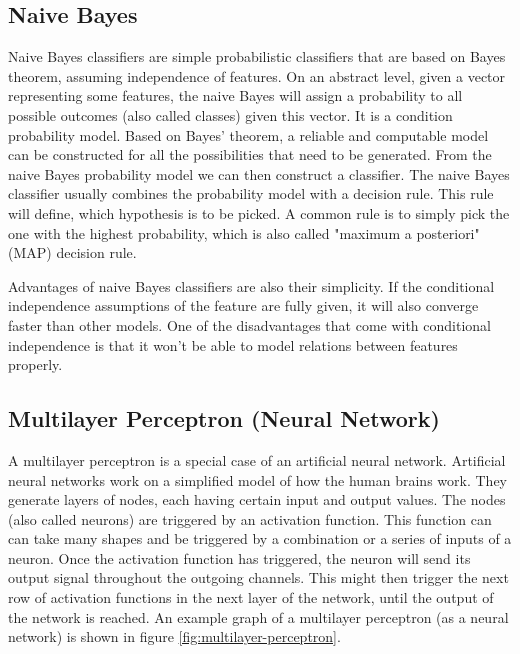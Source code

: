 \subsection{Naive Bayes}
Naive Bayes classifiers are simple probabilistic classifiers that are based on Bayes theorem, assuming independence of features. On an abstract level, given a vector representing some features, the naive Bayes will assign a probability to all possible outcomes (also called classes) given this vector. It is a condition probability model. Based on Bayes' theorem, a reliable and computable model can be constructed for all the possibilities that need to be generated. From the naive Bayes probability model we can then construct a classifier. The naive Bayes classifier usually combines the probability model with a decision rule. This rule will define, which hypothesis is to be picked. A common rule is to simply pick the one with the highest probability, which is also called "maximum a posteriori" (MAP) decision rule. \cite{DataMining}

Advantages of naive Bayes classifiers are also their simplicity. If the conditional independence assumptions of the feature are fully given, it will also converge faster than other models. One of the disadvantages that come with conditional independence is that it won't be able to model relations between features properly. \cite{DataMining}


\subsection{Multilayer Perceptron (Neural Network)}
A multilayer perceptron is a special case of an artificial neural network. Artificial neural networks work on a simplified model of how the human brains work. They generate layers of nodes, each having certain input and output values. The nodes (also called neurons) are triggered by an activation function. This function can can take many shapes and be triggered by a combination or a series of inputs of a neuron. Once the activation function has triggered, the neuron will send its output signal throughout the outgoing channels. This might then trigger the next row of activation functions in the next layer of the network, until the output of the network is reached. An example graph of a multilayer perceptron (as a neural network) is shown in figure \ref{fig:multilayer-perceptron}.

